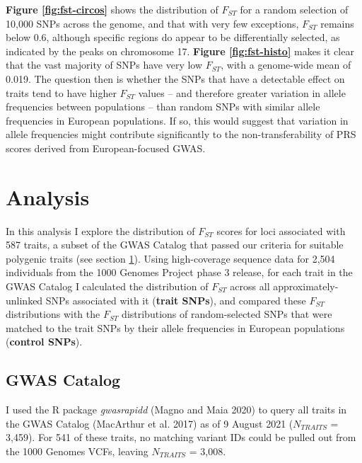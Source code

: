 \documentclass[
]{book}
\begin{document}
\textbf{Figure \ref{fig:fst-circos}} shows the distribution of \(F_{ST}\) for a random selection of 10,000 SNPs across the genome, and that with very few exceptions, \(F_{ST}\) remains below 0.6, although specific regions do appear to be differentially selected, as indicated by the peaks on chromosome 17. \textbf{Figure \ref{fig:fst-histo}} makes it clear that the vast majority of SNPs have very low \(F_{ST}\), with a genome-wide mean of 0.019. The question then is whether the SNPs that have a detectable effect on traits tend to have higher \(F_{ST}\) values -- and therefore greater variation in allele frequencies between populations -- than random SNPs with similar allele frequencies in European populations. If so, this would suggest that variation in allele frequencies might contribute significantly to the non-transferability of PRS scores derived from European-focused GWAS.

\clearpage

\hypertarget{Fst-analysis-chap}{%
\section{Analysis}\label{Fst-analysis-chap}}

In this analysis I explore the distribution of \(F_{ST}\) scores for loci associated with 587 traits, a subset of the GWAS Catalog that passed our criteria for suitable polygenic traits (see section \ref{Fst-analysis-chap}). Using high-coverage sequence data for 2,504 individuals from the 1000 Genomes Project phase 3 release, for each trait in the GWAS Catalog I calculated the distribution of \(F_{ST}\) across all approximately-unlinked SNPs associated with it (\textbf{trait SNPs}), and compared these \(F_{ST}\) distributions with the \(F_{ST}\) distributions of random-selected SNPs that were matched to the trait SNPs by their allele frequencies in European populations (\textbf{control SNPs}).

\hypertarget{gwas-catalog}{%
\subsection{GWAS Catalog}\label{gwas-catalog}}

I used the R package \emph{gwasrapidd} (Magno and Maia 2020) to query all traits in the GWAS Catalog (MacArthur et al. 2017) as of 9 August 2021 (\(N_{TRAITS}\) = 3,459). For 541 of these traits, no matching variant IDs could be pulled out from the 1000 Genomes VCFs, leaving \(N_{TRAITS}\) = 3,008.
\end{document}
